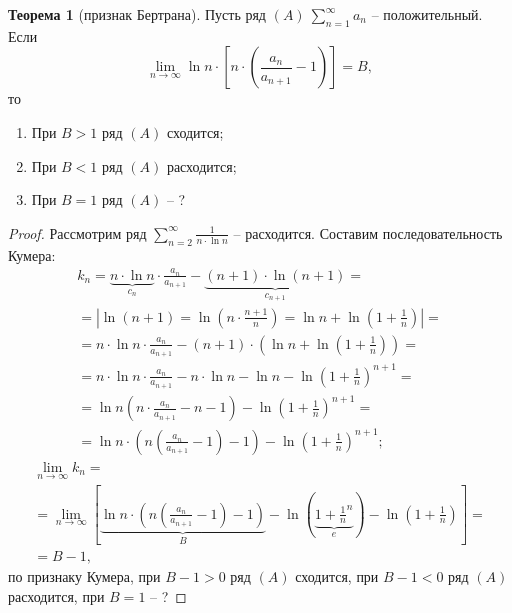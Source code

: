\documentclass{report}
\theoremstyle{definition}
\newtheorem{theorem}{Теорема}[section]
\begin{document}
\begin{theorem}[признак Бертрана]
  Пусть ряд $(A) \ \sum_{n=1}^{\infty}a_n$ -- положительный. Если
  \begin{equation*}
    \underset{n\rightarrow\infty}{\lim} \ln n \cdot [n \cdot (\frac{a_n}{a_{n+1}} - 1)] = B,
  \end{equation*}
  то
  \begin{enumerate}
    \item При $B > 1$ ряд $(A)$ сходится;
    \item При $B < 1$ ряд $(A)$ расходится;
    \item При $B = 1$ ряд $(A)$ -- ?
  \end{enumerate}
\end{theorem}

\begin{proof}
  Рассмотрим ряд $\sum_{n=2}^{\infty} \frac{1}{n\cdot \ln n}$ -- расходится. Составим последовательность Кумера:
  \begin{multline*}
    k_n = \underbrace{n \cdot \ln n}_{c_n} \cdot \frac{a_n}{a_{n+1}} - \underbrace{(n+1) \cdot \ln(n+1)}_{c_{n+1}} = \\
    = \left| \ln(n+1) = \ln(n\cdot \frac{n+1}{n}) = \ln n + \ln(1 + \frac{1}{n}) \right| = \\
    = n \cdot \ln n \cdot \frac{a_n}{a_{n+1}} - (n+1)\cdot (\ln n + \ln(1 + \frac{1}{n})) = \\
    = n \cdot \ln n \cdot \frac{a_n}{a_{n+1}} - n\cdot \ln n - \ln n - \ln(1 + \frac{1}{n})^{n+1} = \\
    = \ln n (n \cdot \frac{a_n}{a_{n+1}} - n - 1) - \ln (1 + \frac{1}{n})^{n+1} = \\
    = \ln n \cdot (n(\frac{a_n}{a_{n+1}} - 1) - 1) - \ln(1+\frac{1}{n})^{n+1};
  \end{multline*}
  \begin{multline*}
    \underset{n\rightarrow\infty}{\lim} k_n = \\
    = \underset{n\rightarrow\infty}{\lim}[\underbrace{\ln n \cdot (n(\frac{a_n}{a_{n+1}} - 1) - 1)}_{B} - \ln(\underbrace{1 + \frac{1}{n}^n}_{e}) - \ln(1 + \frac{1}{n})] = \\
    = B - 1,
  \end{multline*}
  по признаку Кумера, при $B-1 > 0$ ряд $(A)$ сходится, при $B-1 < 0$ ряд $(A)$ расходится, при $B=1$ -- ?
\end{proof}
\end{document}
